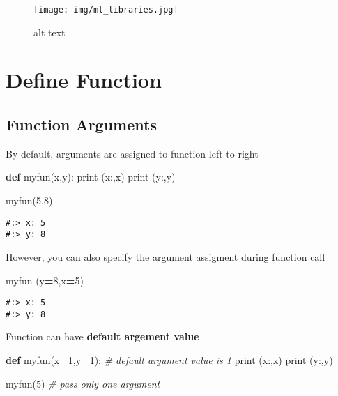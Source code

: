 \documentclass[
]{book}
\newenvironment{Shaded}{\begin{snugshade}}{\end{snugshade}}
\newcommand{\BuiltInTok}[1]{#1}
\newcommand{\CommentTok}[1]{\textcolor[rgb]{0.37,0.37,0.37}{\textit{#1}}}
\newcommand{\DecValTok}[1]{\textcolor[rgb]{0.06,0.06,0.06}{#1}}
\newcommand{\KeywordTok}[1]{\textcolor[rgb]{0.27,0.27,0.27}{\textbf{#1}}}
\newcommand{\NormalTok}[1]{#1}
\newcommand{\OperatorTok}[1]{\textcolor[rgb]{0.43,0.43,0.43}{\textbf{#1}}}
\newcommand{\StringTok}[1]{\textcolor[rgb]{0.5,0.5,0.5}{#1}}
\begin{document}
\begin{figure}
\centering
\texttt{[image: img/ml\_libraries.jpg]}
\caption{alt text}
\end{figure}

\hypertarget{define-function}{%
\section{Define Function}\label{define-function}}

\hypertarget{function-arguments}{%
\subsection{Function Arguments}\label{function-arguments}}

By default, arguments are assigned to function left to right

\begin{Shaded}
\begin{Highlighting}[]
\KeywordTok{def}\NormalTok{ myfun(x,y):}
    \BuiltInTok{print}\NormalTok{ (}\StringTok{\textquotesingle{}x:\textquotesingle{}}\NormalTok{,x)}
    \BuiltInTok{print}\NormalTok{ (}\StringTok{\textquotesingle{}y:\textquotesingle{}}\NormalTok{,y)}
    
\NormalTok{myfun(}\DecValTok{5}\NormalTok{,}\DecValTok{8}\NormalTok{)}
\end{Highlighting}
\end{Shaded}

\begin{verbatim}
#:> x: 5
#:> y: 8
\end{verbatim}

However, you can also specify the argument assigment during function call

\begin{Shaded}
\begin{Highlighting}[]
\NormalTok{myfun (y}\OperatorTok{=}\DecValTok{8}\NormalTok{,x}\OperatorTok{=}\DecValTok{5}\NormalTok{)}
\end{Highlighting}
\end{Shaded}

\begin{verbatim}
#:> x: 5
#:> y: 8
\end{verbatim}

Function can have \textbf{default argement value}

\begin{Shaded}
\begin{Highlighting}[]
\KeywordTok{def}\NormalTok{ myfun(x}\OperatorTok{=}\DecValTok{1}\NormalTok{,y}\OperatorTok{=}\DecValTok{1}\NormalTok{):  }\CommentTok{\# default argument value is 1}
    \BuiltInTok{print}\NormalTok{ (}\StringTok{\textquotesingle{}x:\textquotesingle{}}\NormalTok{,x)}
    \BuiltInTok{print}\NormalTok{ (}\StringTok{\textquotesingle{}y:\textquotesingle{}}\NormalTok{,y)}
    
\NormalTok{myfun(}\DecValTok{5}\NormalTok{)  }\CommentTok{\# pass only one argument}
\end{Highlighting}
\end{Shaded}
\end{document}
